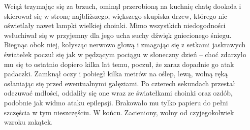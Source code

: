 \documentclass[../MAIN.tex]{subfiles}
\begin{document}
Wciąż trzymając się za brzuch, ominął przerobioną na kuchnię chatę dookoła i skierował się w stronę najbliższego, większego skupiska drzew, którego nie oświetlały nawet lampki wielkiej choinki. Mimo wszystkich niedogodności wsłuchiwał się w przyjemny dla jego ucha suchy dźwięk gniecionego śniegu.
Biegnąc obok niej, kołysząc nerwowo głową i zmagając się z setkami jaskrawych światełek poczuł się jak w pędzącym pociągu w słoneczny dzień -- choć zdarzyło mu się to ostatnio dopiero kilka lat temu, poczuł, że zaraz dopadnie go atak padaczki. Zamknął oczy i pobiegł kilka metrów na oślep, lewą, wolną ręką osłaniając się przed ewentualnymi gałęziami. Po czterech sekundach przestał odczuwać mdłości, oddaliły się one wraz ze światełkami choinki oraz ozdób, podobnie jak widmo ataku epilepsji. Brakowało mu tylko papieru do pełni szczęścia w tym nieszczęściu.
W końcu.
Zacieniony, wolny od czyjegokolwiek wzroku zakątek.
\end{document}
